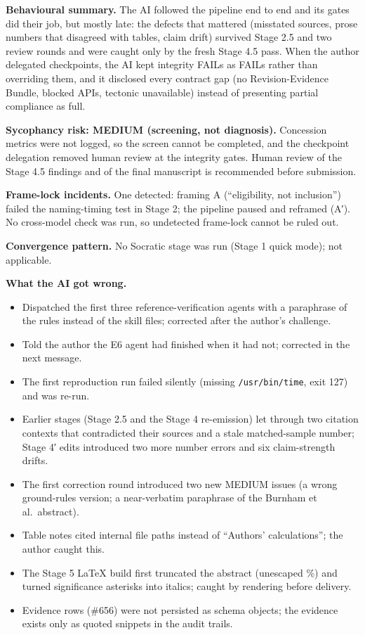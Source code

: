 \documentclass[12pt,a4paper]{article}
\providecommand{\tightlist}{\setlength{\itemsep}{0pt}\setlength{\parskip}{0pt}}
\begin{document}
\textbf{Behavioural summary.} The AI followed the pipeline end to end
and its gates did their job, but mostly late: the defects that mattered
(misstated sources, prose numbers that disagreed with tables, claim
drift) survived Stage 2.5 and two review rounds and were caught only by
the fresh Stage 4.5 pass. When the author delegated checkpoints, the AI
kept integrity FAILs as FAILs rather than overriding them, and it
disclosed every contract gap (no Revision-Evidence Bundle, blocked APIs,
tectonic unavailable) instead of presenting partial compliance as full.

\textbf{Sycophancy risk: MEDIUM (screening, not diagnosis).} Concession
metrics were not logged, so the screen cannot be completed, and the
checkpoint delegation removed human review at the integrity gates. Human
review of the Stage 4.5 findings and of the final manuscript is
recommended before submission.

\textbf{Frame-lock incidents.} One detected: framing A (``eligibility,
not inclusion'') failed the naming-timing test in Stage 2; the pipeline
paused and reframed (A′). No cross-model check was run, so undetected
frame-lock cannot be ruled out.

\textbf{Convergence pattern.} No Socratic stage was run (Stage 1 quick
mode); not applicable.

\textbf{What the AI got wrong.}

\begin{itemize}
\tightlist
\item
  Dispatched the first three reference-verification agents with a
  paraphrase of the rules instead of the skill files; corrected after
  the author's challenge.
\item
  Told the author the E6 agent had finished when it had not; corrected
  in the next message.
\item
  The first reproduction run failed silently (missing
  \texttt{/usr/bin/time}, exit 127) and was re-run.
\item
  Earlier stages (Stage 2.5 and the Stage 4 re-emission) let through two
  citation contexts that contradicted their sources and a stale
  matched-sample number; Stage 4′ edits introduced two more number
  errors and six claim-strength drifts.
\item
  The first correction round introduced two new MEDIUM issues (a wrong
  ground-rules version; a near-verbatim paraphrase of the Burnham et
  al.~abstract).
\item
  Table notes cited internal file paths instead of ``Authors'
  calculations''; the author caught this.
\item
  The Stage 5 LaTeX build first truncated the abstract (unescaped \%)
  and turned significance asterisks into italics; caught by rendering
  before delivery.
\item
  Evidence rows (\#656) were not persisted as schema objects; the
  evidence exists only as quoted snippets in the audit trails.
\end{itemize}
\end{document}
